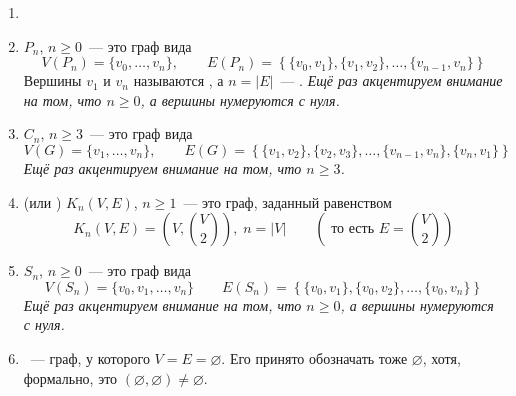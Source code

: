 \begin{definition}
    \begin{enumerate}[label=\arabic*)]
        \item[]
        \item
             $ P_n $, $ n \geqslant 0 $~--- это граф вида
            \[
                V(P_n) = \{ v_0, \ldots, v_n \}, \qquad
                E(P_n) = \left\{ \{v_0, v_1\}, \{v_1, v_2\}, \ldots, \{v_{n-1}, v_n\} \right\}
            \]
            Вершины $ v_1 $ и $ v_n $ называются , а $ n = |E| $~--- .
            \textit{Ещё раз акцентируем внимание на том, что $ n \geqslant 0 $, а вершины нумеруются с нуля.}
        \item
             $ C_n $, $ n \geqslant 3 $~--- это граф вида
            \[
                V(G) = \{ v_1, \ldots, v_n \}, \qquad
                E(G) = \left\{ \{v_1, v_2\}, \{v_2, v_3\}, \ldots, \{v_{n-1}, v_n\}, \{v_n, v_1\} \right\}
            \]
            \textit{Ещё раз акцентируем внимание на том, что $ n \geqslant 3 $.}
        \item
             (или ) $ K_n(V, E) $, $ n \geqslant 1 $~--- это граф, заданный равенством
            \[
                K_n(V, E) = \left( V, \binom{V}{2} \right), \; n = |V| \qquad \left(\text{ то есть } E = \binom{V}{2} \right)
            \]
        \item
             $ S_n $, $ n \geqslant 0 $~--- это граф вида
            \[
                V(S_n) = \{ v_0, v_1, \ldots, v_n \} \qquad
                E(S_n) = \left\{ \{v_0, v_1\}, \{v_0, v_2\}, \ldots, \{v_0, v_n\} \right\}
            \]
            \textit{Ещё раз акцентируем внимание на том, что $ n \geqslant 0 $, а вершины нумеруются с нуля.}
        \item
            ~--- граф, у которого $ V = E = \varnothing $.
            Его принято обозначать тоже $ \varnothing $, хотя, формально, это $ (\varnothing, \varnothing) \neq \varnothing $.
    \end{enumerate}
\end{definition}

